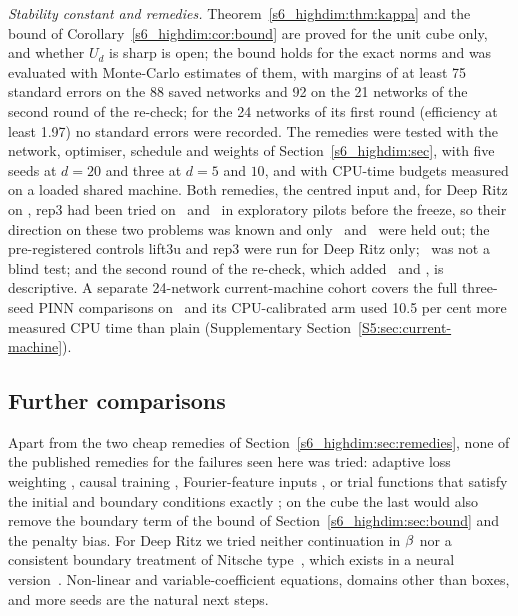 \emph{Stability constant and remedies.} Theorem~\ref{s6_highdim:thm:kappa} and the bound of
Corollary~\ref{s6_highdim:cor:bound} are proved for the unit cube only, and whether $U_d$ is sharp
is open; the bound holds for the exact norms and was evaluated with Monte-Carlo estimates of them,
with margins of at least 75 standard errors on the 88 saved networks and 92 on the 21 networks of
the second round of the re-check; for the 24 networks of its first round (efficiency at least 1.97)
no standard errors were recorded. The remedies were tested with the network, optimiser,
schedule and weights of Section~\ref{s6_highdim:sec}, with five seeds at $d=20$ and three at $d=5$
and $10$, and with CPU-time budgets measured on a loaded shared machine. Both remedies, the centred
input and, for Deep Ritz on \Pone, rep3 had been tried on \Pone\ and \Ptwo\ in exploratory pilots
before the freeze, so their direction on these two problems was known and only \Pridge\ and
\Pcospair\ were held out; the pre-registered controls lift3u and rep3 were run for Deep Ritz only;
\Paltridge\ was not a blind test; and the second round of the re-check, which added \Psinlin\
and \Pexpcos, is descriptive. A separate 24-network current-machine cohort covers the full
three-seed PINN comparisons on \Pone\ and \Psinlin\; its CPU-calibrated arm used 10.5 per cent
more measured CPU time than plain (Supplementary Section~\ref{S5:sec:current-machine}).

\subsection{Further comparisons}\label{s8_discussion:sec:nottried}

Apart from the two cheap remedies of Section~\ref{s6_highdim:sec:remedies}, none of the
published remedies for the failures seen here was tried: adaptive loss
weighting \citep{wangteng2021,wangyu2022}, causal training \citep{wangsankaran2024},
Fourier-feature inputs \citep{wangwang2021}, or trial functions that satisfy the initial
and boundary conditions exactly \citep{lagaris1998,sheng2021,sukumar2022exact}; on the cube the
last would also remove the boundary term of the bound of Section~\ref{s6_highdim:sec:bound} and
the penalty bias. For Deep Ritz we tried neither continuation in $\beta$ nor a consistent boundary
treatment of Nitsche type~\citep{nitsche1971}, which exists in a neural
version~\citep{liao2021nitsche}. Non-linear and variable-coefficient equations, domains other than
boxes, and more seeds are the natural next steps.

